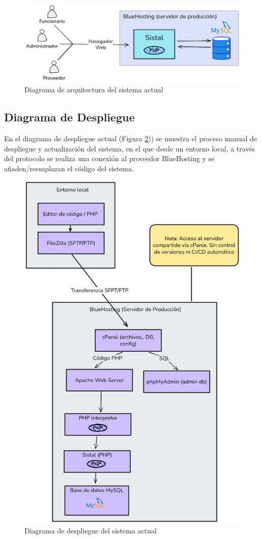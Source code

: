 \begin{figure}[htbp]
    \centering
    \includegraphics[width=\textwidth]{figuras/diagramas-actuales/diagrama-de-arquitectura}
    \caption{Diagrama de arquitectura del sistema actual}
    \label{fig:diagrama-arq-actual}
\end{figure}

\subsection{Diagrama de Despliegue}

En el diagrama de despliegue actual (Figura \ref{fig:diagrama-despliegue-actual})) se muestra el proceso manual de despliegue y actualización del sistema, en el que desde un entorno local, a través del protocolo  se realiza una conexión al proveedor BlueHosting y se añaden/reemplazan el código del sistema.

\begin{figure}[htbp]
    \centering
    \includegraphics[height=0.9\textheight]{figuras/diagramas-actuales/diagrama-de-despliegue}
    \caption{Diagrama de despliegue del sistema actual}
    \label{fig:diagrama-despliegue-actual}
\end{figure}

